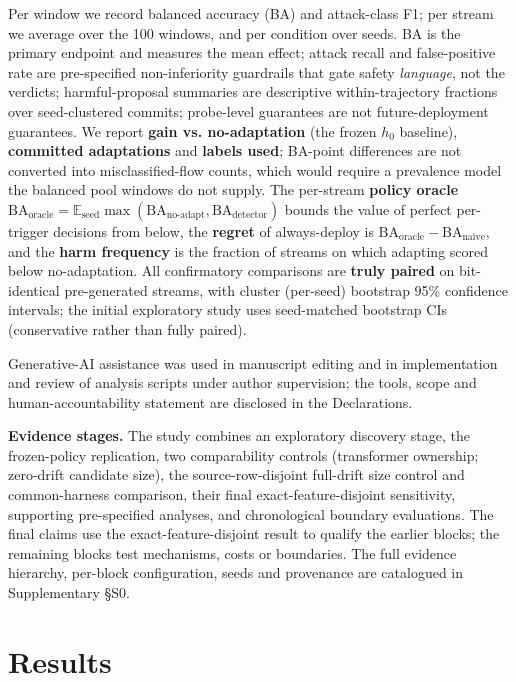 \documentclass[a4paper,fleqn]{cas-sc}
\begin{document}
Per window we record balanced accuracy (BA) and attack-class F1; per stream we average over the 100 windows, and per condition over seeds. BA is the primary endpoint and measures the mean effect; attack recall and false-positive rate are pre-specified non-inferiority guardrails that gate safety \emph{language}, not the verdicts; harmful-proposal summaries are descriptive within-trajectory fractions over seed-clustered commits; probe-level guarantees are not future-deployment guarantees. We report \textbf{gain vs. no-adaptation} (the frozen $h_0$ baseline), \textbf{committed adaptations} and \textbf{labels used}; BA-point differences are not converted into misclassified-flow counts, which would require a prevalence model the balanced pool windows do not supply. The per-stream \textbf{policy oracle} $\mathrm{BA}_{\text{oracle}}=\mathbb{E}_{\text{seed}}\max(\mathrm{BA}_{\text{no-adapt}},\mathrm{BA}_{\text{detector}})$ bounds the value of perfect per-trigger decisions from below, the \textbf{regret} of always-deploy is $\mathrm{BA}_{\text{oracle}}-\mathrm{BA}_{\text{naive}}$, and the \textbf{harm frequency} is the fraction of streams on which adapting scored below no-adaptation. All confirmatory comparisons are \textbf{truly paired} on bit-identical pre-generated streams, with cluster (per-seed) bootstrap 95\% confidence intervals; the initial exploratory study uses seed-matched bootstrap CIs (conservative rather than fully paired).

Generative-AI assistance was used in manuscript editing and in implementation and review of analysis scripts under author supervision; the tools, scope and human-accountability statement are disclosed in the Declarations.

\textbf{Evidence stages.} The study combines an exploratory discovery stage, the frozen-policy replication, two comparability controls (transformer ownership; zero-drift candidate size), the source-row-disjoint full-drift size control and common-harness comparison, their final exact-feature-disjoint sensitivity, supporting pre-specified analyses, and chronological boundary evaluations. The final claims use the exact-feature-disjoint result to qualify the earlier blocks; the remaining blocks test mechanisms, costs or boundaries. The full evidence hierarchy, per-block configuration, seeds and provenance are catalogued in Supplementary \S S0.


\section{Results}
\end{document}
